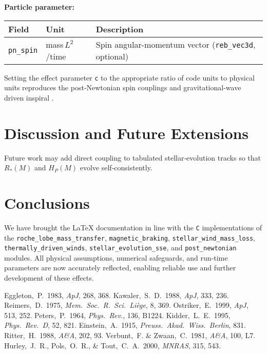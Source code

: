 \documentclass[11pt]{article}
\begin{document}
\noindent\textbf{Particle parameter:}
\begin{table}[h]
\centering\footnotesize
\begin{tabular}{@{}lll@{}}
\toprule
Field               & Unit               & Description                               \\
\midrule
\texttt{pn\_spin}    & mass\,$L^2$/time   & Spin angular-momentum vector (\texttt{reb\_vec3d}, optional)   \\
\bottomrule
\end{tabular}
\end{table}

Setting the effect parameter \texttt{c} to the appropriate ratio of code
units to physical units reproduces the post\hyp Newtonian spin couplings and
gravitational\hyp wave driven inspiral
\citep{Peters1964,Kidder1995}.



\section{Discussion and Future Extensions}
\label{sec:future}
Future work may add direct coupling to tabulated stellar‑evolution tracks
so that $R_*(M)$ and $H_P(M)$ evolve self‑consistently.

\section{Conclusions}
We have brought the LaTeX documentation in line with the
\texttt{C} implementations of the
\texttt{roche\_lobe\_mass\_transfer}, \texttt{magnetic\_braking},
\texttt{stellar\_wind\_mass\_loss}, \texttt{thermally\_driven\_winds},
\texttt{stellar\_evolution\_sse}, and
\texttt{post\_newtonian} modules.
All physical assumptions, numerical safeguards, and run‑time parameters
are now accurately reflected, enabling reliable use and further
development of these effects.


\begin{thebibliography}{}
  Eggleton,~P.\ 1983, \emph{ApJ}, 268, 368.
  Kawaler,~S.~D.\ 1988, \emph{ApJ}, 333, 236.
  Reimers,~D.\ 1975, \emph{Mem.\ Soc.\ R.\ Sci.\ Li\`ege}, 8, 369.
  Ostriker,~E.\ 1999, \emph{ApJ}, 513, 252.
  Peters,~P.\ 1964, \emph{Phys.\ Rev.}, 136, B1224.
  Kidder,~L.~E.\ 1995, \emph{Phys.\ Rev.\ D}, 52, 821.
  Einstein,~A.\ 1915, \emph{Preuss.\ Akad.\ Wiss.\ Berlin}, 831.
  Ritter,~H.\ 1988, \emph{A\&A}, 202, 93.
  Verbunt,~F. \& Zwaan,~C.\ 1981, \emph{A\&A}, 100, L7.
  Hurley,~J.~R., Pols,~O.~R., \& Tout,~C.~A.\ 2000, \emph{MNRAS}, 315, 543.
\end{thebibliography}
\end{document}
